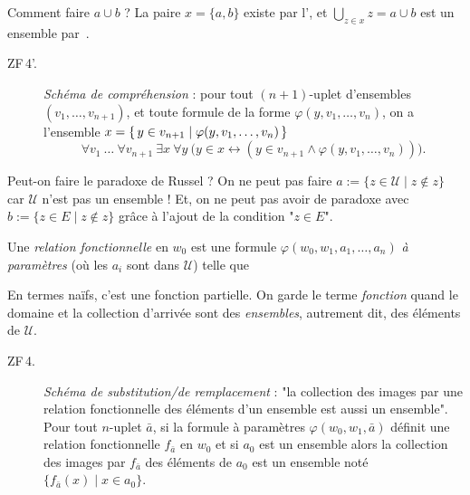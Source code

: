 \documentclass[./main]{subfiles}
\begin{document}
  \begin{rmk}
    Comment faire $a \cup b$ ?
    La paire $x = \{a,b\}$ existe par l'\pairaxiom, et $\bigcup_{z \in x} z = a \cup b$ est un ensemble par~.
  \end{rmk}

  \begin{description}
    \item[ZF\,4'.\label{ZF4'}]
      \textit{Schéma de compréhension} :
      pour tout $(n+1)$-uplet d'ensembles $(v_1, \ldots, v_{n+1})$, et toute formule de la forme $\varphi(y, v_1, \ldots, v_n)$, on a l'ensemble
      $x = \mleft\{\,y \in v_{n+1} \;\middle|\; \varphi(y, v_1, \ldots, v_n)\,\mright\}$
      \[
      \forall v_1\: \ldots\: \forall v_{n+1} \: \exists x \: \forall y \: \big(y \in x \leftrightarrow (y \in v_{n+1} \land \varphi(y, v_1, \ldots, v_n))\big)
      .\] 

  \end{description}

  \begin{rmk}
    Peut-on faire le paradoxe de Russel ?
    On ne peut pas faire $a := \{z \in \mathcal{U}  \mid z \not\in z \}$ car $\mathcal{U}$ n'est pas un ensemble !
    Et, on ne peut pas avoir de paradoxe avec $b := \{z \in E  \mid z \not\in z\}$ grâce à l'ajout de la condition "$z \in E$".
  \end{rmk}

  \begin{defn}
    Une \textit{relation fonctionnelle} en $w_0$ est une formule $\varphi(w_0, w_1, a_1, \ldots, a_n)$ \textit{à paramètres} (où les $a_i$ sont dans $\mathcal{U}$) telle que

  \end{defn}

  En termes naïfs, c'est une fonction partielle. On garde le terme \textit{fonction} quand le domaine et la collection d'arrivée sont des \textit{ensembles}, autrement dit, des éléments de $\mathcal{U}$.

  \begin{description}
    \item[ZF\,4.\label{ZF4}]
      \textit{Schéma de substitution/de remplacement} :
      "la collection des images par une relation fonctionnelle des éléments d'un ensemble est aussi un ensemble".
      Pour tout $n$-uplet $\bar{a}$, si la formule à paramètres $\varphi(w_0, w_1, \bar{a})$ définit une relation fonctionnelle $f_{\bar{a}}$ en $w_0$ et si $a_0$ est un ensemble alors la collection des images par $f_{\bar{a}}$ des éléments de $a_0$ est un ensemble noté $\{ f_{\bar{a}}(x) \mid x \in a_0\}$.
  \end{description}
\end{document}
